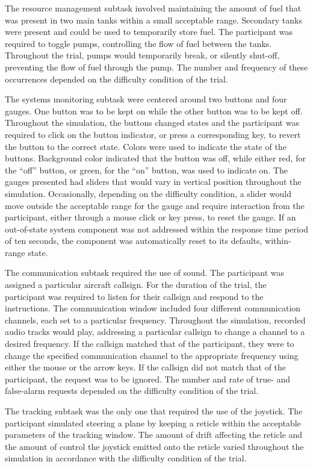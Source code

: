 \documentclass[11pt]{article}
\begin{document}
	The resource management subtask involved maintaining the amount of fuel that was present in two main tanks within a small acceptable range. Secondary tanks were present and could be used to temporarily store fuel. The participant was required to toggle pumps, controlling the flow of fuel between the tanks. Throughout the trial, pumps would temporarily break, or silently shut-off, preventing the flow of fuel through the pump. The number and frequency of these occurrences depended on the difficulty condition of the trial.
	
	The systems monitoring subtask were centered around two buttons and four gauges. One button was to be kept on while the other button was to be kept off. Throughout the simulation, the buttons changed states and the participant was required to click on the button indicator, or press a corresponding key, to revert the button to the correct state. Colors were used to indicate the state of the buttons. Background color indicated that the button was off, while either red, for the ``off'' button, or green, for the ``on'' button, was used to indicate on. The gauges presented had sliders that would vary in vertical position throughout the simulation. Occasionally, depending on the difficulty condition, a slider would move outside the acceptable range for the gauge and require interaction from the participant, either through a mouse click or key press, to reset the gauge. If an out-of-state system component was not addressed within the response time period of ten seconds, the component was automatically reset to its defaults, within-range state.
	
	The communication subtask required the use of sound. The participant was assigned a particular aircraft callsign. For the duration of the trial, the participant was required to listen for their callsign and respond to the instructions. The communication window included four different communication channels, each set to a particular frequency. Throughout the simulation, recorded audio tracks would play, addressing a particular callsign to change a channel to a desired frequency. If the callsign matched that of the participant, they were to change the specified communication channel to the appropriate frequency using either the mouse or the arrow keys. If the callsign did not match that of the participant, the request was to be ignored. The number and rate of true- and false-alarm requests depended on the difficulty condition of the trial.
	
	The tracking subtask was the only one that required the use of the joystick. The participant simulated steering a plane by keeping a reticle within the acceptable parameters of the tracking window. The amount of drift affecting the reticle and the amount of control the joystick emitted onto the reticle varied throughout the simulation in accordance with the difficulty condition of the trial. 
	
\end{document}
